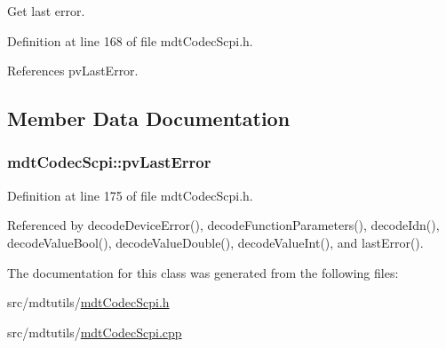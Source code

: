 Get last error. 



Definition at line 168 of file mdt\-Codec\-Scpi.\-h.



References pv\-Last\-Error.



\subsection{Member Data Documentation}
\hypertarget{classmdt_codec_scpi_ac08e83ff5a33b4b61fe4b173fc6753c8}{
\subsubsection[{pv\-Last\-Error}]{ mdt\-Codec\-Scpi\-::pv\-Last\-Error\hspace{0.3cm}{\ttfamily [protected]}}}\label{classmdt_codec_scpi_ac08e83ff5a33b4b61fe4b173fc6753c8}


Definition at line 175 of file mdt\-Codec\-Scpi.\-h.



Referenced by decode\-Device\-Error(), decode\-Function\-Parameters(), decode\-Idn(), decode\-Value\-Bool(), decode\-Value\-Double(), decode\-Value\-Int(), and last\-Error().



The documentation for this class was generated from the following files\-:\begin{DoxyCompactItemize}
\item 
src/mdtutils/\hyperlink{mdt_codec_scpi_8h}{mdt\-Codec\-Scpi.\-h}\item 
src/mdtutils/\hyperlink{mdt_codec_scpi_8cpp}{mdt\-Codec\-Scpi.\-cpp}\end{DoxyCompactItemize}
